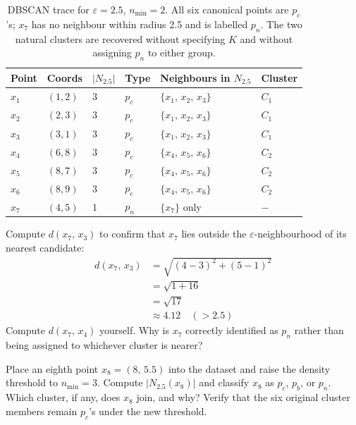\begin{table}[ht]
\centering
\begin{tabular}{p{}p{}p{}p{}p{}p{}}
    \toprule
    \textbf{Point} & \textbf{Coords} & \textbf{$|N_{2.5}|$} & \textbf{Type} & \textbf{Neighbours in $N_{2.5}$} & \textbf{Cluster} \\
    \midrule
    $x_1$ & $(1,2)$ & $3$ & $p_c$  & $\{x_1,\, x_2,\, x_3\}$          & $C_1$ \\
    $x_2$ & $(2,3)$ & $3$ & $p_c$  & $\{x_1,\, x_2,\, x_3\}$          & $C_1$ \\
    $x_3$ & $(3,1)$ & $3$ & $p_c$  & $\{x_1,\, x_2,\, x_3\}$          & $C_1$ \\
    $x_4$ & $(6,8)$ & $3$ & $p_c$  & $\{x_4,\, x_5,\, x_6\}$          & $C_2$ \\
    $x_5$ & $(8,7)$ & $3$ & $p_c$  & $\{x_4,\, x_5,\, x_6\}$          & $C_2$ \\
    $x_6$ & $(8,9)$ & $3$ & $p_c$  & $\{x_4,\, x_5,\, x_6\}$          & $C_2$ \\
    $x_7$ & $(4,5)$ & $1$ & $p_n$  & $\{x_7\}$ only                    & $-$ \\
    \bottomrule
\end{tabular}
\vspace{2em}
\caption{DBSCAN trace for $\varepsilon{=}2.5$, $n_{\min}{=}2$. All six canonical points are $p_c$'s; $x_7$ has no neighbour within radius 2.5 and is labelled $p_n$. The two natural clusters are recovered without specifying $K$ and without assigning $p_n$ to either group.}
\label{tab:dbscan_trace}
\end{table}





 Compute $d(x_7,\,x_3)$ to confirm that $x_7$ lies outside the $\varepsilon$-neighbourhood of its nearest candidate:
\begin{align*}
    d(x_7,\,x_3) &= \sqrt{(4-3)^2 + (5-1)^2} \\
                 &= \sqrt{1 + 16} \\
                 &= \sqrt{17} \\
                 &\approx 4.12 \quad (> 2.5)
\end{align*}
Compute $d(x_7,\,x_4)$ yourself.
Why is $x_7$ correctly identified as $p_n$ rather than being assigned to whichever cluster is nearer?


 Place an eighth point $x_8{=}(8,\,5.5)$ into the dataset and raise the density threshold to $n_{\min}{=}3$.
Compute $|N_{2.5}(x_8)|$ and classify $x_8$ as $p_c$, $p_b$, or $p_n$.
Which cluster, if any, does $x_8$ join, and why?
Verify that the six original cluster members remain $p_c$'s under the new threshold.

